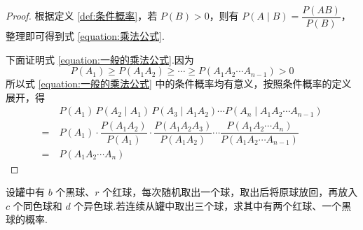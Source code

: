 \begin{proof}
    根据定义 \ref{def:条件概率}，若 $P(B)>0$，则有 $P(A \mid B) = \dfrac{P(AB)}{P(B)}$，整理即可得到式 \eqref{equation:乘法公式}.

    下面证明式 \eqref{equation:一般的乘法公式}.因为
    $$
    P(A_1) \geqslant P(A_1 A_2) \geqslant \cdots \geqslant P(A_1 A_2 \cdots A_{n-1}) > 0
    $$
    所以式 \eqref{equation:一般的乘法公式} 中的条件概率均有意义，按照条件概率的定义展开，得
    $$
    \begin{aligned}
        & P(A_1) \, P(A_2 \mid A_1) \, P(A_3 \mid A_1 A_2) \cdots P(A_n \mid A_1 A_2 \cdots A_{n-1}) \\
        =\ & P(A_1) \cdot \dfrac{P(A_1 A_2)}{P(A_1)} \cdot \dfrac{P(A_1 A_2 A_3)}{P(A_1 A_2)} \cdots \dfrac{P(A_1 A_2 \cdots A_n)}{P(A_1 A_2 \cdots A_{n-1})} \\
        =\ & P(A_1 A_2 \cdots A_n)
    \end{aligned}
    $$

    \vspace{-2em}
\end{proof}

\begin{example}[][波利亚罐子模型]
    \indent 设罐中有 $b$ 个黑球、$r$ 个红球，每次随机取出一个球，取出后将原球放回，再放入 $c$ 个同色球和 $d$ 个异色球.若连续从罐中取出三个球，求其中有两个红球、一个黑球的概率.
\end{example}

